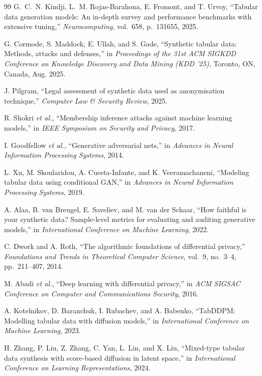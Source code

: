 \documentclass[preprint,12pt]{elsarticle}
\begin{document}
\begin{thebibliography}{99}
G.~C.~N. Kindji, L.~M. Rojas-Barahona, E. Fromont, and T. Urvoy,
``Tabular data generation models: An in-depth survey and performance benchmarks with extensive tuning,''
\emph{Neurocomputing}, vol.~658, p.~131655, 2025.

G. Cormode, S. Maddock, E. Ullah, and S. Gade,
``Synthetic tabular data: Methods, attacks and defenses,''
in \emph{Proceedings of the 31st ACM SIGKDD Conference on Knowledge Discovery and Data Mining (KDD '25)},
Toronto, ON, Canada, Aug. 2025.

J. Pilgram,
``Legal assessment of synthetic data used as anonymisation technique,''
\emph{Computer Law \& Security Review}, 2025.

R. Shokri \emph{et al.},
``Membership inference attacks against machine learning models,''
in \emph{IEEE Symposium on Security and Privacy}, 2017.

I. Goodfellow \emph{et al.},
``Generative adversarial nets,''
in \emph{Advances in Neural Information Processing Systems}, 2014.

L. Xu, M. Skoularidou, A. Cuesta-Infante, and K. Veeramachaneni,
``Modeling tabular data using conditional GAN,''
in \emph{Advances in Neural Information Processing Systems}, 2019.

A. Alaa, B. van Breugel, E. Saveliev, and M. van der Schaar,
``How faithful is your synthetic data? Sample-level metrics for evaluating and auditing generative models,''
in \emph{International Conference on Machine Learning}, 2022.

C. Dwork and A. Roth,
``The algorithmic foundations of differential privacy,''
\emph{Foundations and Trends in Theoretical Computer Science}, vol.~9, no.~3--4, pp.~211--407, 2014.

M. Abadi \emph{et al.},
``Deep learning with differential privacy,''
in \emph{ACM SIGSAC Conference on Computer and Communications Security}, 2016.

A. Kotelnikov, D. Baranchuk, I. Rubachev, and A. Babenko,
``TabDDPM: Modelling tabular data with diffusion models,''
in \emph{International Conference on Machine Learning}, 2023.

H. Zhang, P. Liu, Z. Zhang, C. Yan, L. Lin, and X. Liu,
``Mixed-type tabular data synthesis with score-based diffusion in latent space,''
in \emph{International Conference on Learning Representations}, 2024.


\end{thebibliography}
\end{document}
